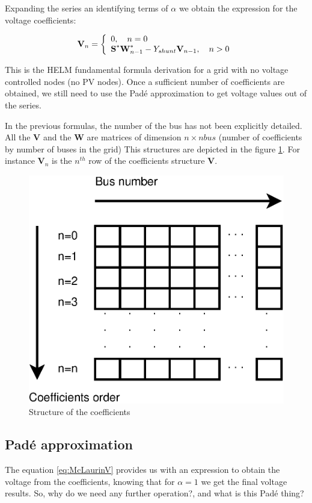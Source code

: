 \documentclass[nols,a4paper,twoside,notoc,fleqn]{tufte-book}
\begin{document}
Expanding the series an identifying terms of $\alpha$ we obtain the expression for the voltage coefficients:

\begin{equation}
\textbf{V}_n =
\left\{
\begin{array}{ll}
\mathlarger{0}, \quad n=0\\
\mathlarger{\textbf{S}^* \textbf{W}^*_{n-1} - Y_{shunt} \textbf{V}_{n-1} }, \quad n>0
\end{array}
\right.
\end{equation}

This is the HELM fundamental formula derivation for a grid with no voltage controlled nodes (no PV nodes). Once a sufficient number of coefficients are obtained, we still need to use the Pad\'e approximation to get voltage values out of the series.


In the previous formulas, the number of the bus has not been explicitly detailed. All the $\textbf{V}$ and the $\textbf{W}$ are matrices of dimension $n \times nbus$ (number of coefficients by number of buses in the grid) This structures are depicted in the figure \ref{fig:CoefficientsStructure}. For instance $\textbf{V}_n$ is the $n^{th}$ row of the coefficients structure $\textbf{V}$.


\begin{figure}[h]
	\centering
	\includegraphics[width=0.4\linewidth]{img/CoefficientsStructure.eps}
	\caption{Structure of the coefficients}
	\label{fig:CoefficientsStructure}
\end{figure}

\subsection{Pad\'e approximation}

The equation \ref{eq:McLaurinV} provides us with an expression to obtain the voltage from the coefficients, knowing that for $\alpha=1$ we get the final voltage results. So, why do we need any further operation?, and what is this Pad\'e thing?
\end{document}
